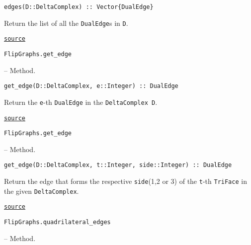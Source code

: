 \begin{adjustwidth}{2em}{0pt}


\begin{verbatim}
edges(D::DeltaComplex) :: Vector{DualEdge}
\end{verbatim}

Return the list of all the \texttt{DualEdge}s in \texttt{D}.



\href{https://github.com/schto223/FlipGraphs.jl/blob/490c01a7adf74b42f27dda05099165c47ae8133e/src/deltaComplex.jl#L324-L328}{\texttt{source}}


\end{adjustwidth}
\hypertarget{3085851381282903585}{\texttt{FlipGraphs.get\_edge}}  -- {Method.}

\begin{adjustwidth}{2em}{0pt}


\begin{verbatim}
get_edge(D::DeltaComplex, e::Integer) :: DualEdge
\end{verbatim}

Return the \texttt{e}-th \texttt{DualEdge} in the \texttt{DeltaComplex D}.



\href{https://github.com/schto223/FlipGraphs.jl/blob/490c01a7adf74b42f27dda05099165c47ae8133e/src/deltaComplex.jl#L310-L314}{\texttt{source}}


\end{adjustwidth}
\hypertarget{14400153517699669145}{\texttt{FlipGraphs.get\_edge}}  -- {Method.}

\begin{adjustwidth}{2em}{0pt}


\begin{verbatim}
get_edge(D::DeltaComplex, t::Integer, side::Integer) :: DualEdge
\end{verbatim}

Return the edge that forms the respective \texttt{side}(1,2 or 3) of the \texttt{t}-th \texttt{TriFace} in the given \texttt{DeltaComplex}.



\href{https://github.com/schto223/FlipGraphs.jl/blob/490c01a7adf74b42f27dda05099165c47ae8133e/src/deltaComplex.jl#L317-L321}{\texttt{source}}


\end{adjustwidth}
\hypertarget{17895896900520043067}{\texttt{FlipGraphs.quadrilateral\_edges}}  -- {Method.}

